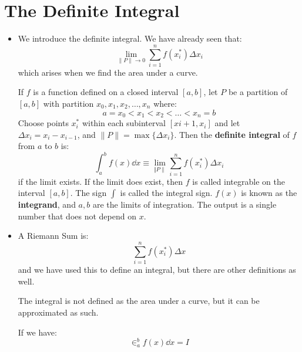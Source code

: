 \section{The Definite Integral}
\begin{itemize}
    \item We introduce the definite integral. We have already seen that:
    \begin{equation}
        \lim_{\lVert P\rVert \to 0} \sum_{i=1}^n f(x_i^*) \Delta x_i
        \label{eq:}
    \end{equation}
    which arises when we find the area under a curve.
    \begin{definition}
        If $f$ is a function defined on a closed interval $[a,b]$, let $P$ be a partition of $[a,b]$ with partition $x_0,x_1,x_2,\dots,x_n$ where:
        \begin{equation}
            a=x_0<x_1<x_2<\dots<x_n=b
            \label{eq:}
        \end{equation}
        Choose points $x_i^*$ within each subinterval $[x{i+1},x_i]$ and let $\Delta x_i=x_i-x_{i-1}$, and $\lVert P \rVert =\max\{\Delta x_i\}$. Then the \textbf{definite integral} of $f$ from $a$ to $b$ is:
        \begin{equation}
            \int_a^b f(x) \dd{x} \equiv \lim_{\Vert P \rVert} \sum_{i=1}^n f(x_i^*)\Delta x_i
            \label{eq:}
        \end{equation}
        if the limit exists. If the limit does exist, then $f$ is called integrable on the interval $[a,b]$. The sign $\int$ is called the integral sign. $f(x)$ is known as the \textbf{integrand}, and $a,b$ are the limits of integration. The output is a single number that does not depend on $x$.
    \end{definition}
    \item A Riemann Sum is:
    \begin{equation}
        \sum_{i=1}^n f(x_i^*)\Delta x
        \label{eq:}
    \end{equation}
    and we have used this to define an integral, but there are other definitions as well.
    \begin{warning}
        The integral is not defined as the area under a curve, but it can be approximated as such.
    \end{warning}
    \begin{idea}
        If we have:
        \begin{equation}
            \in_a^b f(x) \dd{x} = I
            \label{eq:}
        \end{equation}

\end{idea}
\end{itemize}
